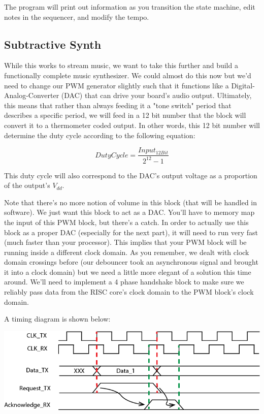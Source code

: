 \documentclass[11pt]{article}
\begin{document}
The program will print out information as you transition the state machine, edit notes in the sequencer, and modify the tempo.

\subsection{Subtractive Synth}
While this works to stream music, we want to take this further and build a functionally complete music synthesizer. We could almost do this now but we'd need to change our PWM generator slightly such that it functions like a Digital-Analog-Converter (DAC) that can drive your board's audio output. Ultimately, this means that rather than always feeding it a "tone switch" period that describes a specific period, we will feed in a 12 bit number that the block will convert it to a thermometer coded output. In other words, this 12 bit number will determine the duty cycle according to the following equation:

\begin{equation}
    Duty Cycle = \frac{Input_{12 Bit}}{2^{12} - 1}
\end{equation}

This duty cycle will also correspond to the DAC's output voltage as a proportion of the output's $V_{dd}$.

Note that there's no more notion of volume in this block (that will be handled in software). We just want this block to act as a DAC. You'll have to memory map the input of this PWM block, but there's a catch. In order to actually use this block as a proper DAC (especially for the next part), it will need to run very fast (much faster than your processor). This implies that your PWM block will be running inside a different clock domain. As you remember, we dealt with clock domain crossings before (our debouncer took an asynchronous signal and brought it into a clock domain) but we need a little more elegant of a solution this time around. We'll need to implement a 4 phase handshake block to make sure we reliably pass data from the RISC core's clock domain to the PWM block's clock domain.

A timing diagram is shown below:

\begin{center}
\includegraphics[width=\textwidth]{images/ss_r_ack.png}
\end{center}
\end{document}
